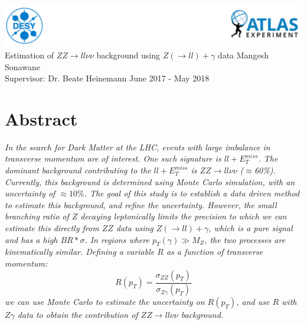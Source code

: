 \documentclass[11pt,a4paper,final]{report}
\begin{document}
\begin{titlepage}
\centering
\vfill
\vfill
\includegraphics[width = \linewidth]{Title_Head.png}
\vspace{1 in}\\
{\huge Estimation of $ZZ \rightarrow ll\nu\nu$ background using $Z(\rightarrow ll)+\gamma$ data}
\vfill
{\LARGE Mangesh Sonawane \\ Supervisor: Dr. Beate Heinemann}
\vfill
{\LARGE June 2017 - May 2018}
\vfill
\vfill
\end{titlepage}
\tableofcontents
\newpage
\section*{Abstract}
\textit{
In the search for Dark Matter at the LHC, events with large imbalance in transverse momentum are of interest. One such signature is $ll + E_T^{miss}$. The dominant background contributing to the $ll + E_T^{miss}$ is $ZZ \rightarrow ll\nu\nu$ ($\approx$60\%).  Currently, this background is determined using Monte Carlo simulation, with an uncertainty of $\approx 10\%$. The goal of this study is to establish a data driven method to estimate this background, and refine the uncertainty. However, the small branching ratio of $Z$ decaying leptonically limits the precision to which we can estimate this directly from $ZZ$ data using $Z(\rightarrow ll)+\gamma$, which is a pure signal and has a high $BR*\sigma$. In regions where $p_{T}(\gamma) \gg M_{Z}$, the two processes are kinematically similar.
Defining a variable $R$ as a function of transverse momentum:
\begin{equation*}
	R(p_{T}) = \frac{\sigma_{ZZ}(p_{T})}{\sigma_{Z\gamma}(p_T)}
\end{equation*}
we can use Monte Carlo to estimate the uncertainty on $R(p_T)$, and use $R$ with $Z\gamma$ data to obtain the contribution of $ZZ \rightarrow ll\nu\nu$ background.
}
\end{document}
